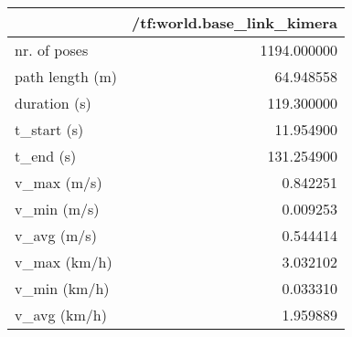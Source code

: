 \begin{tabular}{lr}
\toprule
{} &  /tf:world.base\_link\_kimera \\
\midrule
nr. of poses    &                 1194.000000 \\
path length (m) &                   64.948558 \\
duration (s)    &                  119.300000 \\
t\_start (s)     &                   11.954900 \\
t\_end (s)       &                  131.254900 \\
v\_max (m/s)     &                    0.842251 \\
v\_min (m/s)     &                    0.009253 \\
v\_avg (m/s)     &                    0.544414 \\
v\_max (km/h)    &                    3.032102 \\
v\_min (km/h)    &                    0.033310 \\
v\_avg (km/h)    &                    1.959889 \\
\bottomrule
\end{tabular}
